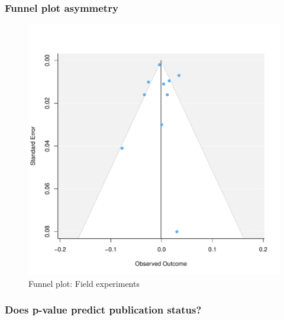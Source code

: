 \documentclass[usenames,dvipsnames]{beamer}
\begin{document}
\begin{frame}[label=supplemental]
\frametitle{Funnel plot asymmetry \hyperlink{pub_bias}{}}

\begin{figure}[!hb]
\vspace*{-3mm}
\includegraphics[scale = 0.45]{../figs/funnel_re_field.pdf}
\vspace{-0.2cm}
\caption{Funnel plot: Field experiments}
\small
\vspace{-0.5cm}
\label{fig: funnel_all}
\end{figure}
\end{frame}


\begin{frame}[label=p_ols_logit]
\frametitle{Does p-value predict publication status? \hyperlink{pub_bias}{}}

\footnotesize


\end{frame}

\end{document}
